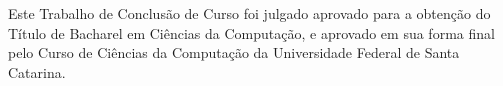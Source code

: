 \documentclass[
    12pt,       %
    openright,      %
    twoside,      %
    a4paper,      %
    english,      %
    french,       %
    spanish,      %
    brazil,       %
    ]{abntex2}
\begin{document}
  \frenchspacing


  \imprimircapa

  \imprimirfolhaderosto*
  

  \begin{folhadeaprovacao}

    \begin{center}
      {\ABNTEXchapterfont\large\imprimirautor}

      \vspace*{\fill}
      {\ABNTEXchapterfont\large\bfseries\imprimirtitulo}
      \vspace*{\fill}


     Este Trabalho de Conclusão de Curso foi julgado aprovado para a
     obtenção do Título de Bacharel em Ciências da Computação, e
     aprovado em sua forma final pelo Curso de Ciências da Computação
     da Universidade Federal de Santa Catarina.
     \end{center}


     \begin{center}
      \vspace*{0.5cm}
      {\large\imprimirlocal}
      \par
      {\large\imprimirdata}
      \vspace*{1cm}
    \end{center}

  \end{folhadeaprovacao}
\end{document}
